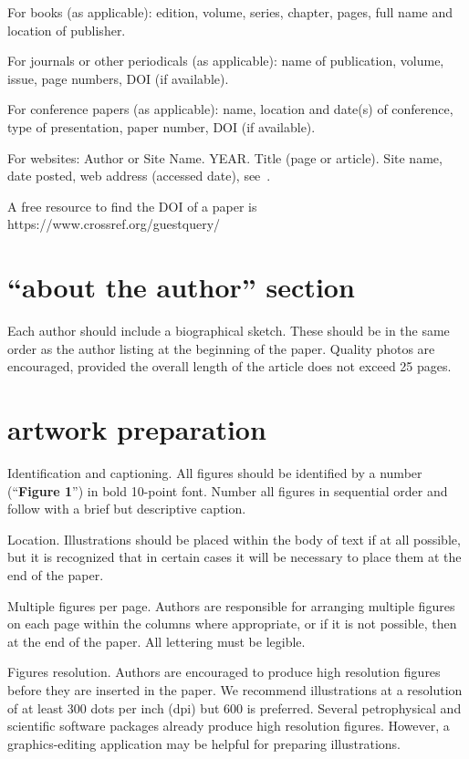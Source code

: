 \documentclass[10pt,twocolumn,twoside]{article}
\begin{document}
For books (as applicable): edition, volume, series, chapter, pages, full name and location of publisher.

For journals or other periodicals (as applicable): name of publication, volume, issue, page numbers, DOI (if available).

For conference papers (as applicable): name, location and date(s) of conference, type of presentation, paper number, DOI (if available). 

For websites: Author or Site Name. YEAR. Title (page or article). Site name, date posted, web address (accessed date), see~\cite{spwlawebsite}. 

A free resource to find the DOI of a paper is https://www.crossref.org/guestquery/ 

\section{“about the author” section}
Each author should include a biographical sketch. These should be in the same order as the author listing at the beginning of the paper. Quality photos are encouraged, provided the overall length of the article does not exceed 25 pages.

\section{artwork preparation}
Identification and captioning. All figures should be identified by a number (“\textbf{Figure 1}”) in bold 10-point font. Number all figures in sequential order and follow with a brief but descriptive caption. 

Location. Illustrations should be placed within the body of text if at all possible, but it is recognized that in certain cases it will be necessary to place them at the end of the paper.

Multiple figures per page. Authors are responsible for arranging multiple figures on each page within the columns where appropriate, or if it is not possible, then at the end of the paper. All lettering must be legible.

Figures resolution. Authors are encouraged to produce high resolution figures before they are inserted in the paper. We recommend illustrations at a resolution of at least 300 dots per inch (dpi) but 600 is preferred. Several petrophysical and scientific software packages already produce high resolution figures. However, a graphics-editing application may be helpful for preparing illustrations. 
\end{document}
